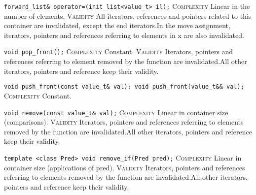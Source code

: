 \noindent{}\hspace*{0.25em}\lstinline[basicstyle=\ttfamily\color{corange}]{forward_list& operator=(init_list<value_t> il);} \textsc{Complexity} Linear in the number of elements. \textsc{Validity} All iterators, references and pointers related to this container are invalidated, except the end iterators.In the move assignment, iterators, pointers and references referring to elements in x are also invalidated.\\\vspace{-0.6em}

\noindent{}\hspace*{0.25em}\lstinline[basicstyle=\ttfamily\color{cgreen}]{void pop_front();} \textsc{Complexity} Constant. \textsc{Validity} Iterators, pointers and references referring to element removed by the function are invalidated.All other iterators, pointers and reference keep their validity.\\\vspace{-0.6em}

\noindent{}\hspace*{0.25em}\lstinline[basicstyle=\ttfamily\color{cgreen}]{void push_front(const value_t& val); void push_front(value_t&& val);} \textsc{Complexity} Constant.\\\vspace{-0.6em}

\noindent{}\hspace*{0.25em}\lstinline[basicstyle=\ttfamily\color{corange}]{void remove(const value_t& val);} \textsc{Complexity} Linear in container size (comparisons). \textsc{Validity} Iterators, pointers and references referring to elements removed by the function are invalidated.All other iterators, pointers and reference keep their validity.\\\vspace{-0.6em}

\noindent{}\hspace*{0.25em}\lstinline[basicstyle=\ttfamily\color{corange}]{template <class Pred> void remove_if(Pred pred);} \textsc{Complexity} Linear in container size (applications of pred). \textsc{Validity} Iterators, pointers and references referring to elements removed by the function are invalidated.All other iterators, pointers and reference keep their validity.\\\vspace{-0.6em}

